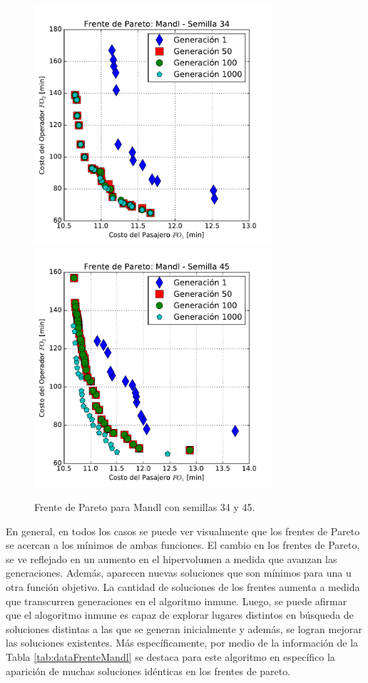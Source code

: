\begin{figure}[p]
\centering
\includegraphics[width=0.79\textwidth]{img/frente_Mandl_s34}
\includegraphics[width=0.79\textwidth]{img/frente_Mandl_s45}
\caption{Frente de Pareto para Mandl con semillas 34 y 45.}
\label{fig:paretoMandl2}
\end{figure}

En general, en todos los casos se puede ver visualmente que los frentes de Pareto se acercan a los mínimos de ambas funciones. El cambio en los frentes de Pareto, se ve reflejado en un aumento en el hipervolumen a medida que avanzan las generaciones. Además, aparecen nuevas soluciones que son mínimos para una u otra función objetivo. La cantidad de soluciones de los frentes aumenta a medida que transcurren generaciones en el algoritmo inmune. Luego, se puede afirmar que el alogoritmo inmune es capaz de explorar lugares distintos en búsqueda de soluciones distintas a las que se generan inicialmente y además, se logran mejorar las soluciones existentes. Más específicamente, por medio de la información de la Tabla \ref{tab:dataFrenteMandl} se destaca para este algoritmo en específico la aparición de muchas soluciones idénticas en los frentes de pareto. 

